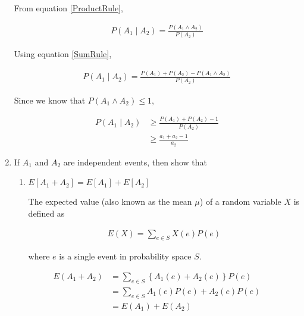 \begin{enumerate}
From equation \ref{ProductRule}, 

\begin{equation*}
\begin{aligned}
P(A_1 \mid A_2) = \frac{P(A_1 \wedge A_2)}{P(A_2)}
\end{aligned}   
\end{equation*}  

Using equation \ref{SumRule},

\begin{equation*}
\begin{aligned}
P(A_1 \mid A_2) = \frac{P(A_1) + P(A_2) - P(A_1 \wedge A_2)}{P(A_2)}
\end{aligned}   
\end{equation*}  

Since we know that $P(A_1 \wedge A_2) \leq 1$,

\begin{equation*}
\begin{aligned}
P(A_1 \mid A_2) &\geq \frac{P(A_1) + P(A_2) - 1}{P(A_2)}\\
&\geq \frac{a_1 + a_2 - 1}{a_2}
\end{aligned}   
\end{equation*}  

\item \relax[8 points] If $A_1$ and $A_2$ are independent events, then
  show that
  \begin{enumerate}
  \item $E[A_1 + A_2] = E[A_1] + E[A_2]$

The expected value (also known as the mean $\mu$) of a random variable $X$ is defined as 

\begin{equation*}
\begin{aligned}
E(X) = \sum_{e \in S} X(e) P(e)
\end{aligned}
\end{equation*} 

where $e$ is a single event in probability space $S$.
\end{enumerate}


\begin{equation*}
\begin{aligned}
E(A_1 + A_2) &= \sum_{e \in S} \left \{A_1(e) + A_2(e) \right \} P(e)\\
&= \sum_{e \in S} A_1(e) P(e)+ A_2(e) P(e)\\
&= E(A_1)  + E(A_2) 
\end{aligned}
\end{equation*}


\end{enumerate}
